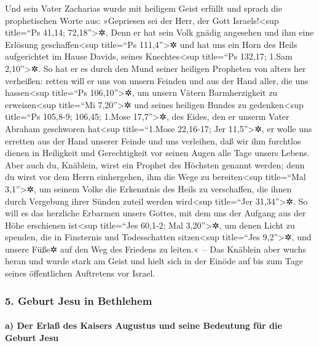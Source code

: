  Und sein Vater Zacharias wurde mit heiligem Geist
erfüllt und sprach die prophetischen Worte aus: 
»Gepriesen sei der Herr, der Gott Israels!\textless sup title=``Ps
41,14; 72,18''\textgreater✲, Denn er hat sein Volk gnädig angesehen und
ihm eine Erlösung geschaffen\textless sup title=``Ps
111,4''\textgreater✲  und hat uns ein Horn des Heils
aufgerichtet im Hause Davids, seines Knechtes\textless sup title=``Ps
132,17; 1.Sam 2,10''\textgreater✲.  So hat er es durch
den Mund seiner heiligen Propheten von alters her verheißen:
 retten will er uns von unsern Feinden und aus der Hand
aller, die uns hassen\textless sup title=``Ps 106,10''\textgreater✲,
 um unsern Vätern Barmherzigkeit zu erweisen\textless sup
title=``Mi 7,20''\textgreater✲ und seines heiligen Bundes zu
gedenken\textless sup title=``Ps 105,8-9; 106,45; 1.Mose
17,7''\textgreater✲,  des Eides, den er unserm Vater
Abraham geschworen hat\textless sup title=``1.Mose 22,16-17; Jer
11,5''\textgreater✲, er wolle uns erretten aus der Hand unserer Feinde
 und uns verleihen, daß wir ihm furchtlos dienen
 in Heiligkeit und Gerechtigkeit vor seinen Augen alle
Tage unsers Lebens.  Aber auch du, Knäblein, wirst ein
Prophet des Höchsten genannt werden; denn du wirst vor dem Herrn
einhergehen, ihm die Wege zu bereiten\textless sup title=``Mal
3,1''\textgreater✲,  um seinem Volke die Erkenntnis des
Heils zu verschaffen, die ihnen durch Vergebung ihrer Sünden zuteil
werden wird\textless sup title=``Jer 31,34''\textgreater✲.
 So will es das herzliche Erbarmen unsers Gottes, mit dem
uns der Aufgang aus der Höhe erschienen ist\textless sup title=``Jes
60,1-2; Mal 3,20''\textgreater✲,  um denen Licht zu
spenden, die in Finsternis und Todesschatten sitzen\textless sup
title=``Jes 9,2''\textgreater✲, und unsere Füße✲ auf den Weg des
Friedens zu leiten.«~--  Das Knäblein aber wuchs heran
und wurde stark am Geist und hielt sich in der Einöde auf bis zum Tage
seines öffentlichen Auftretens vor Israel.

\hypertarget{geburt-jesu-in-bethlehem}{%
\subsubsection{5. Geburt Jesu in
Bethlehem}\label{geburt-jesu-in-bethlehem}}

\hypertarget{a-der-erlauxdf-des-kaisers-augustus-und-seine-bedeutung-fuxfcr-die-geburt-jesu}{%
\paragraph{a) Der Erlaß des Kaisers Augustus und seine Bedeutung für die
Geburt
Jesu}\label{a-der-erlauxdf-des-kaisers-augustus-und-seine-bedeutung-fuxfcr-die-geburt-jesu}}

